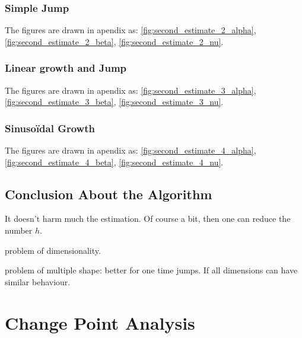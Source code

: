 \documentclass[11pt]{book}
\begin{document}
\subsection{Simple Jump}

The figures are drawn in apendix as: \ref{fig:second_estimate_2_alpha}, \ref{fig:second_estimate_2_beta}, \ref{fig:second_estimate_2_nu}.


\subsection{Linear growth and Jump}


The figures are drawn in apendix as: \ref{fig:second_estimate_3_alpha}, \ref{fig:second_estimate_3_beta}, \ref{fig:second_estimate_3_nu}.


\subsection{Sinusoïdal Growth}


The figures are drawn in apendix as: \ref{fig:second_estimate_4_alpha}, \ref{fig:second_estimate_4_beta}, \ref{fig:second_estimate_4_nu}.


\section{Conclusion About the Algorithm}

It doesn't harm much the estimation. Of course a bit, then one can reduce the number $h$.

problem of dimensionality. 

problem of multiple shape: better for one time jumps. If all dimensions can have similar behaviour.





































\chapter{Change Point Analysis}
\label{chap:change_point}
\end{document}
